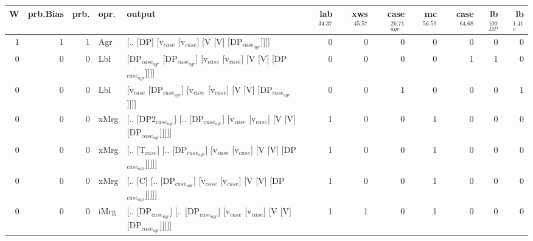 \begin{tabularx}{\linewidth}{rrrlXrrrrrrr}
\hline
   W &   prb.Bias &   prb. & opr.   & output                                                                                                  &   lab$^{34.37}$ &   xws$^{45.57}$ &   case$_{agr}^{26.71}$ &   mc$^{56.59}$ &   case$^{64.68}$ &   lb$_{DP}^{100}$ &   lb$_{v}^{1.41}$ \\
\hline
   1 &       1 &   1 & Agr  & [.. [DP] [v$_{case}$ [v$_{case}$] [V [V] [DP$_{case_{agr}}$]]]]                                                       &             0 &             0 &                  0 &            0 &              0 &                0 &             0 \\
   0 &       0 &   0 & Lbl  & [DP$_{case_{agr}}$ [DP$_{case_{agr}}$] [v$_{case}$ [v$_{case}$] [V [V] [DP$_{case_{agr}}$]]]]                                     &             0 &             0 &                  0 &            0 &              1 &                1 &             0 \\
   0 &       0 &   0 & Lbl  & [v$_{case}$ [DP$_{case_{agr}}$] [v$_{case}$ [v$_{case}$] [V [V] [DP$_{case_{agr}}$]]]]                                          &             0 &             0 &                  1 &            0 &              0 &                0 &             1 \\
   0 &       0 &   0 & xMrg & [.. [DP2$_{case_{agr}}$] [.. [DP$_{case_{agr}}$] [v$_{case}$ [v$_{case}$] [V [V] [DP$_{case_{agr}}$]]]]]                          &             1 &             0 &                  0 &            1 &              0 &                0 &             0 \\
   0 &       0 &   0 & xMrg & [.. [T$_{case}$] [.. [DP$_{case_{agr}}$] [v$_{case}$ [v$_{case}$] [V [V] [DP$_{case_{agr}}$]]]]]                                &             1 &             0 &                  0 &            1 &              0 &                0 &             0 \\
   0 &       0 &   0 & xMrg & [.. [C] [.. [DP$_{case_{agr}}$] [v$_{case}$ [v$_{case}$] [V [V] [DP$_{case_{agr}}$]]]]]                                     &             1 &             0 &                  0 &            1 &              0 &                0 &             0 \\
   0 &       0 &   0 & iMrg & [.. [DP$_{case_{agr}}$] [.. [DP$_{case_{agr}}$] [v$_{case}$ [v$_{case}$] [V [V] [DP$_{case_{agr}}$]]]]]                           &             1 &             1 &                  0 &            1 &              0 &                0 &             0 \\

\end{tabularx}
